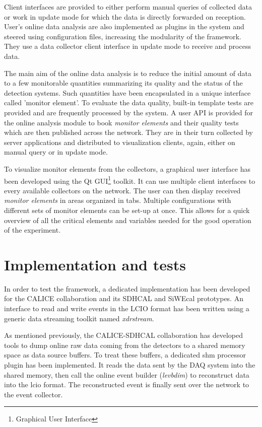 \documentclass[conference]{IEEEtran}
\begin{document}
Client interfaces are provided to either perform manual queries of collected data or work in update mode for which the data is directly forwarded on reception. User's online data analysis are also implemented as plugins in the system and steered using configuration files, increasing the modularity of the framework. They use a data collector client interface in update mode to receive and process data.

The main aim of the online data analysis is to reduce the initial amount of data to a few monitorable quantities summarizing its quality and the status of the detection systems. Such quantities have been encapsulated in a unique interface called 'monitor element'. To evaluate the data quality, built-in template tests are provided and are frequently processed by the system. A user API is provided for the online analysis module to book \textit{monitor elements} and their quality tests which are then published across the network. They are in their turn collected by server applications and distributed to visualization clients, again, either on manual query or in update mode.

To visualize monitor elements from the collectors, a graphical user interface has been developed using the Qt\cite{QT} GUI\footnote{Graphical User Interface} toolkit. It can use multiple client interfaces to every available collectors on the network. The user can then display received \textit{monitor elements} in areas organized in tabs. Multiple configurations with different sets of monitor elements can be set-up at once. This allows for a quick overview of all the critical elements and variables needed for the good operation of the experiment.


\section{Implementation and tests}
In order to test the framework, a dedicated implementation has been developed for the CALICE collaboration and its SDHCAL and SiWEcal prototypes. 
An interface to read and write events in the LCIO format has been written using a generic data streaming toolkit named \textit{xdrstream}.


As mentioned previously, the CALICE-SDHCAL collaboration has developed tools to dump online raw data coming from the detectors to a shared memory space as data source buffers. To treat these buffers, a dedicated shm processor plugin has been implemented. It reads the data sent by the DAQ system into the shared memory, then call the online event builder (\textit{levbdim}) to reconstruct data into the lcio format. The reconstructed event is finally sent over the network to the event collector.
\end{document}

